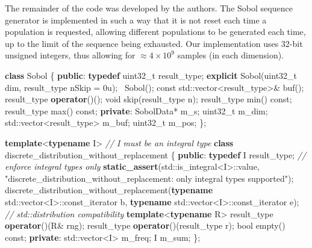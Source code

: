 \documentclass[]{article}
\newenvironment{Shaded}{\begin{snugshade}}{\end{snugshade}}
\newcommand{\KeywordTok}[1]{\textcolor[rgb]{0.13,0.29,0.53}{\textbf{{#1}}}}
\newcommand{\DataTypeTok}[1]{\textcolor[rgb]{0.13,0.29,0.53}{{#1}}}
\newcommand{\DecValTok}[1]{\textcolor[rgb]{0.00,0.00,0.81}{{#1}}}
\newcommand{\StringTok}[1]{\textcolor[rgb]{0.31,0.60,0.02}{{#1}}}
\newcommand{\CommentTok}[1]{\textcolor[rgb]{0.56,0.35,0.01}{\textit{{#1}}}}
\newcommand{\NormalTok}[1]{{#1}}
\begin{document}
The remainder of the code was developed by the authors. The Sobol
sequence generator is implemented in such a way that it is not reset
each time a population is requested, allowing different populations to
be generated each time, up to the limit of the sequence being exhausted.
Our implementation uses 32-bit unsigned integers, thus allowing for
\(\approx4\times10^9\) samples (in each dimension).

\begin{Shaded}
\begin{Highlighting}[]
  \KeywordTok{class} \NormalTok{Sobol}
  \NormalTok{\{}
  \KeywordTok{public}\NormalTok{:}
    \KeywordTok{typedef} \DataTypeTok{uint32_t} \NormalTok{result_type;}
    \KeywordTok{explicit} \NormalTok{Sobol(}\DataTypeTok{uint32_t} \NormalTok{dim, result_type nSkip = }\DecValTok{0u}\NormalTok{);}
    \NormalTok{~Sobol();}
    \DataTypeTok{const} \NormalTok{std::vector<result_type>& buf();}
    \NormalTok{result_type }\KeywordTok{operator}\NormalTok{()();}
    \DataTypeTok{void} \NormalTok{skip(result_type n);}
    \NormalTok{result_type min() }\DataTypeTok{const}\NormalTok{;}
    \NormalTok{result_type max() }\DataTypeTok{const}\NormalTok{;}
  \KeywordTok{private}\NormalTok{:}
    \NormalTok{SobolData* m_s;}
    \DataTypeTok{uint32_t} \NormalTok{m_dim;}
    \NormalTok{std::vector<result_type> m_buf;}
    \DataTypeTok{uint32_t} \NormalTok{m_pos;}
  \NormalTok{\};}

  \KeywordTok{template}\NormalTok{<}\KeywordTok{typename} \NormalTok{I> }\CommentTok{// I must be an integral type}
  \KeywordTok{class} \NormalTok{discrete_distribution_without_replacement}
  \NormalTok{\{}
  \KeywordTok{public}\NormalTok{:}
    \KeywordTok{typedef} \NormalTok{I result_type;}
    \CommentTok{// enforce integral types only}
    \KeywordTok{static_assert}\NormalTok{(std::is_integral<I>::value, }
      \StringTok{"discrete_distribution_without_replacement: only integral types supported"}\NormalTok{);}
    \NormalTok{discrete_distribution_without_replacement(}\KeywordTok{typename} \NormalTok{std::vector<I>::const_iterator b, }
                                              \KeywordTok{typename} \NormalTok{std::vector<I>::const_iterator e);}
    \CommentTok{// std::distribution compatibility}
    \KeywordTok{template}\NormalTok{<}\KeywordTok{typename} \NormalTok{R>}
    \NormalTok{result_type }\KeywordTok{operator}\NormalTok{()(R& rng);}
    \NormalTok{result_type }\KeywordTok{operator}\NormalTok{()(result_type r);}
    \DataTypeTok{bool} \NormalTok{empty() }\DataTypeTok{const}\NormalTok{;}
  \KeywordTok{private}\NormalTok{:}
    \NormalTok{std::vector<I> m_freq;}
    \NormalTok{I m_sum;}
  \NormalTok{\};}
\end{Highlighting}
\end{Shaded}
\end{document}
